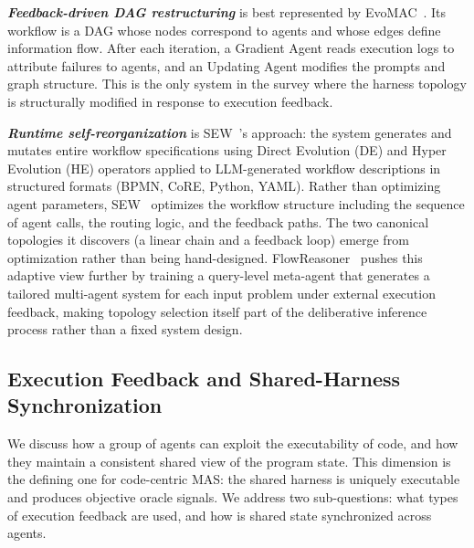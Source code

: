 \documentclass{llmxive}
\begin{document}
\textbf{\textit{Feedback-driven DAG restructuring}} is best
represented by EvoMAC~\cite{Hu2025EvoMAC}. Its workflow is a DAG
whose nodes correspond to agents and whose edges define
information flow. After each iteration, a Gradient Agent reads
execution logs to attribute failures to agents, and an Updating
Agent modifies the prompts and graph structure. This is the only
system in the survey where the harness topology is structurally
modified in response to execution feedback.

\textbf{\textit{Runtime self-reorganization}} is
SEW~\cite{Liu2025SEW}'s approach: the system generates and mutates
entire workflow specifications using Direct Evolution (DE) and
Hyper Evolution (HE) operators applied to LLM-generated workflow
descriptions in structured formats (BPMN, CoRE, Python, YAML).
Rather than optimizing agent parameters, SEW~\cite{Liu2025SEW}
optimizes the workflow structure including the sequence of agent
calls, the routing logic, and the feedback paths. The two
canonical topologies it discovers (a linear chain and a feedback
loop) emerge from optimization rather than being hand-designed. FlowReasoner~\cite{gao2025flowreasoner} pushes this adaptive view
further by training a query-level meta-agent that generates a
tailored multi-agent system for each input problem under external
execution feedback, making topology selection itself part of the
deliberative inference process rather than a fixed system design.

\subsection{Execution Feedback and Shared-Harness Synchronization}

We discuss how a group of agents can exploit the executability of
code, and how they maintain a consistent shared view of the
program state.
This dimension is the defining one for code-centric MAS: the
shared harness is uniquely executable and produces objective
oracle signals. We address two sub-questions: what types of
execution feedback are used, and how is shared state
synchronized across agents.
\end{document}
